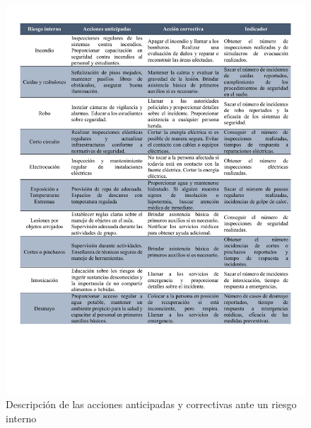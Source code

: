     
    \begin{figure}[H]
        \centering
        \includegraphics[trim = {10mm 40mm 10mm 10mm},clip,scale=0.41]{22/Img/riesgosInternos2.pdf}
        \caption{Descripción de las acciones anticipadas y correctivas ante un riesgo interno }
        \label{fig:accionAntInterno}
    \end{figure}
    
